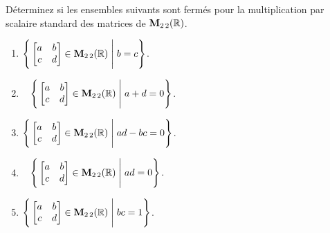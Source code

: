 \begin{prob} \label{prob04.6} Déterminez si les
ensembles suivants sont fermés pour la multiplication par scalaire standard
des matrices de $\mathbf{M}_{2 \,2}(\mathbb{R})$.

\begin{enumerate}
\item
  $\Bigg\{  \bmatrix a&b\\ c&d\endbmatrix \in \M_{2 \,2}(\R) \;\Bigg|\; b=c\Bigg\}$.
\item\sov~
  $\Bigg\{  \bmatrix a&b\\ c&d\endbmatrix \in \M_{2 \,2}(\R) \;\Bigg|\; a+d=0\Bigg\}$.
\item
  $\Bigg\{  \bmatrix a&b\\ c&d\endbmatrix \in \M_{2 \,2}(\R) \;\Bigg|\; ad-bc=0\Bigg\}$.
\item\sov~
  $\Bigg\{  \bmatrix a&b\\ c&d\endbmatrix \in \M_{2 \,2}(\R) \;\Bigg|\; ad=0\Bigg\}$.
\item
  $\Bigg\{  \bmatrix a&b\\ c&d\endbmatrix \in \M_{2 \,2}(\R) \;\Bigg|\; bc=1\Bigg\}$.
\end{enumerate}
\end{prob}

